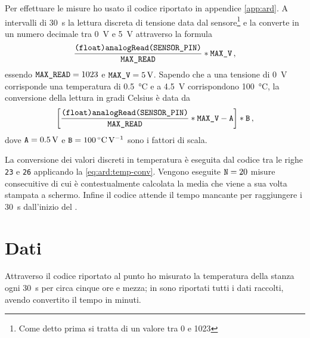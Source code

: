             Per effettuare le misure ho usato il codice riportato in appendice \ref{app:ard}. A intervalli di \SI{30}{\second} la lettura discreta di tensione data dal sensore\footnote{Come detto prima si tratta di un valore tra \num{0} e \num{1023}} e la converte in un numero decimale tra \SI{0}{\volt} e \SI{5}{V} attraverso la formula
            \begin{equation*}
                \frac{\text{\ttfamily (float)analogRead(SENSOR\_PIN)}}{\text{\ttfamily MAX\_READ}} * \text{\ttfamily MAX\_V}
                \,,
            \end{equation*}
            essendo $\text{\ttfamily MAX\_READ} = 1023$ e $\text{\ttfamily MAX\_V} = \SI{5}{\volt}$. Sapendo che a una tensione di \SI{0}{\volt} corrisponde una temperatura di \SI{0.5}{\celsius} e a \SI{4.5}{\volt} corrispondono \SI{100}{\celsius}, la conversione della lettura in gradi Celsius è data da
            \begin{equation}
                \bqty{\frac{\text{\ttfamily (float)analogRead(SENSOR\_PIN)}}{\text{\ttfamily MAX\_READ}} * \text{\ttfamily MAX\_V} - \text{\ttfamily A}} * \text{\ttfamily B}
                \mycomma
                \label{eq:ard:temp-conv}
            \end{equation}
            dove $\text{\ttfamily A} = \SI{0.5}{\volt}$ e $\text{\ttfamily B} = \SI{100}{\celsius\per\volt}$ sono i fattori di scala.

            La conversione dei valori discreti in temperatura è eseguita dal codice tra le righe \texttt{23} e \texttt{26} applicando la \eqref{eq:ard:temp-conv}. Vengono eseguite $\text{\ttfamily N} = 20$ misure consecuitive di cui è contestualmente calcolata la media che viene a sua volta stampata a schermo. Infine il codice attende il tempo mancante per raggiungere i \SI{30}{\second} dall'inizio del \txtloop.

    \section{Dati}
        Attraverso il codice riportato al punto  ho misurato la temperatura della stanza ogni \SI{30}{s} per circa cinque ore e mezza; in  sono riportati tutti i dati raccolti, avendo convertito il tempo in minuti.

